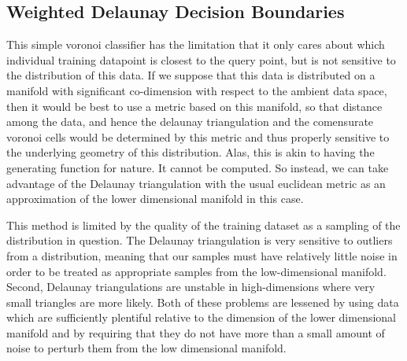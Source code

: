 \subsection{Weighted Delaunay Decision Boundaries}
This simple voronoi classifier has the limitation that it only cares
about which individual training datapoint is closest to the query
point, but is not sensitive to the distribution of this data. If we
suppose that this data is distributed on a manifold with significant
co-dimension with respect to the ambient data space, then it would be
best to use a metric based on this manifold, so that distance among
the data, and hence the delaunay triangulation and the comensurate
voronoi cells would be determined by this metric and thus properly
sensitive to the underlying geometry of this distribution. Alas, this
is akin to having the generating function for nature. It cannot be
computed. So instead, we can take advantage of the Delaunay
triangulation with the usual euclidean metric as an approximation of
the lower dimensional manifold in this case.

This method is limited by the quality of the training dataset as a
sampling of the distribution in question. The Delaunay triangulation
is very sensitive to outliers from a distribution, meaning that our
samples must have relatively little noise in order to be treated as
appropriate samples from the low-dimensional manifold. Second,
Delaunay triangulations are unstable in high-dimensions where very
small triangles are more likely. Both of these problems are lessened
by using data which are sufficiently plentiful relative to the
dimension of the lower dimensional manifold and by requiring that they
do not have more than a small amount of noise to perturb them from the
low dimensional manifold. 

